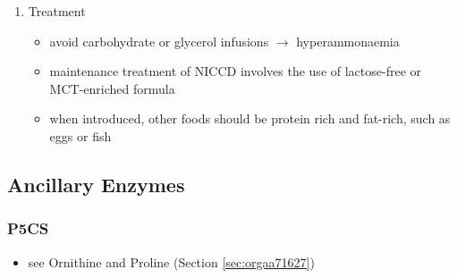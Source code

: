 \documentclass{scrartcl}
\begin{document}
\begin{enumerate}
\item Treatment
\label{sec:orgc596275}
\begin{itemize}
\item avoid carbohydrate or glycerol infusions \(\to\) hyperammonaemia
\item maintenance treatment of NICCD involves the use of lactose-free or
MCT-enriched formula
\item when introduced, other foods should be protein rich and fat-rich,
such as eggs or fish
\end{itemize}
\end{enumerate}
\subsection{Ancillary Enzymes}
\label{sec:orgba5133f}
\subsubsection{P5CS}
\label{sec:org45b10dd}
\begin{itemize}
\item see Ornithine and Proline (Section \ref{sec:orgaa71627})
\end{itemize}
\end{document}
